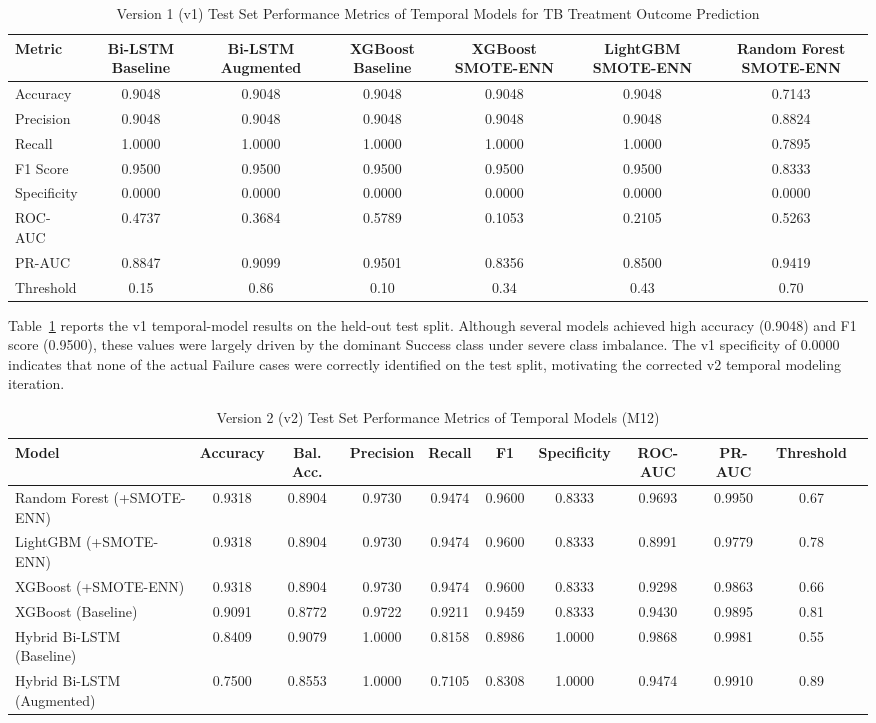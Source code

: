 \documentclass[12pt]{article}
\begin{document}
\begin{table}[H]
\caption{Version 1 (v1) Test Set Performance Metrics of Temporal Models for TB Treatment Outcome Prediction}
\label{tab:temporal_performance_v1}
\begin{tabular}{lcccccc}
\toprule
Metric & Bi-LSTM Baseline & Bi-LSTM Augmented & XGBoost Baseline & XGBoost SMOTE-ENN & LightGBM SMOTE-ENN & Random Forest SMOTE-ENN \\
\midrule
Accuracy & 0.9048 & 0.9048 & 0.9048 & 0.9048 & 0.9048 & 0.7143 \\
Precision & 0.9048 & 0.9048 & 0.9048 & 0.9048 & 0.9048 & 0.8824 \\
Recall & 1.0000 & 1.0000 & 1.0000 & 1.0000 & 1.0000 & 0.7895 \\
F1 Score & 0.9500 & 0.9500 & 0.9500 & 0.9500 & 0.9500 & 0.8333 \\
Specificity & 0.0000 & 0.0000 & 0.0000 & 0.0000 & 0.0000 & 0.0000 \\
ROC-AUC & 0.4737 & 0.3684 & 0.5789 & 0.1053 & 0.2105 & 0.5263 \\
PR-AUC & 0.8847 & 0.9099 & 0.9501 & 0.8356 & 0.8500 & 0.9419 \\
Threshold & 0.15 & 0.86 & 0.10 & 0.34 & 0.43 & 0.70 \\
\bottomrule
\end{tabular}%
\end{table}

Table~\ref{tab:temporal_performance_v1} reports the v1 temporal-model results on the held-out test split. Although several models achieved high accuracy (0.9048) and F1 score (0.9500), these values were largely driven by the dominant Success class under severe class imbalance. The v1 specificity of 0.0000 indicates that none of the actual Failure cases were correctly identified on the test split, motivating the corrected v2 temporal modeling iteration.

\begin{table}[H]
\caption{Version 2 (v2) Test Set Performance Metrics of Temporal Models (M12)}
\label{tab:temporal_performance_v2}
\begin{tabular}{lcccccccccc}
\toprule
Model & Accuracy & Bal. Acc. & Precision & Recall & F1 & Specificity & ROC-AUC & PR-AUC & Threshold \\
\midrule
Random Forest (+SMOTE-ENN) & 0.9318 & 0.8904 & 0.9730 & 0.9474 & 0.9600 & 0.8333 & 0.9693 & 0.9950 & 0.67 \\
LightGBM (+SMOTE-ENN) & 0.9318 & 0.8904 & 0.9730 & 0.9474 & 0.9600 & 0.8333 & 0.8991 & 0.9779 & 0.78 \\
XGBoost (+SMOTE-ENN) & 0.9318 & 0.8904 & 0.9730 & 0.9474 & 0.9600 & 0.8333 & 0.9298 & 0.9863 & 0.66 \\
XGBoost (Baseline) & 0.9091 & 0.8772 & 0.9722 & 0.9211 & 0.9459 & 0.8333 & 0.9430 & 0.9895 & 0.81 \\
Hybrid Bi-LSTM (Baseline) & 0.8409 & 0.9079 & 1.0000 & 0.8158 & 0.8986 & 1.0000 & 0.9868 & 0.9981 & 0.55 \\
Hybrid Bi-LSTM (Augmented) & 0.7500 & 0.8553 & 1.0000 & 0.7105 & 0.8308 & 1.0000 & 0.9474 & 0.9910 & 0.89 \\
\bottomrule
\end{tabular}%
\end{table}
\end{document}
